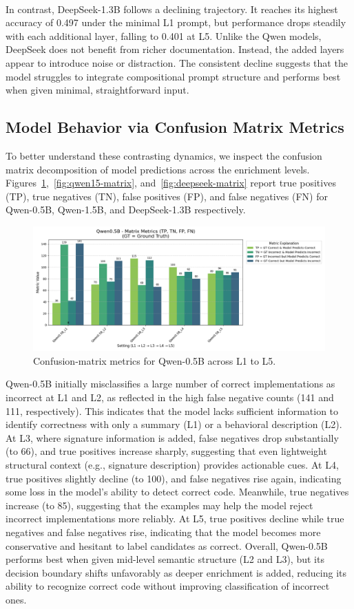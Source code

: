 \documentclass[a4paper]{usiinfbachelorproject}
\begin{document}
\\
In contrast, DeepSeek-1.3B follows a declining trajectory. It reaches its highest accuracy of 0.497 under the minimal L1 prompt, but performance drops steadily with each additional layer, falling to 0.401 at L5. Unlike the Qwen models, DeepSeek does not benefit from richer documentation. Instead, the added layers appear to introduce noise or distraction. The consistent decline suggests that the model struggles to integrate compositional prompt structure and performs best when given minimal, straightforward input.

\subsection{Model Behavior via Confusion Matrix Metrics}
To better understand these contrasting dynamics, we inspect the confusion matrix decomposition of model predictions across the enrichment levels. Figures~\ref{fig:qwen05-matrix},~\ref{fig:qwen15-matrix}, and~\ref{fig:deepseek-matrix} report true positives (TP), true negatives (TN), false positives (FP), and false negatives (FN) for Qwen-0.5B, Qwen-1.5B, and DeepSeek-1.3B respectively.
\begin{figure}[H]\centering
  \includegraphics[width=\linewidth]{figures/Qwen0.5B_matrix_metrics.png}
  \caption{Confusion-matrix metrics for Qwen-0.5B across L1 to L5.}
  \label{fig:qwen05-matrix}
\end{figure}
\noindent
Qwen-0.5B initially misclassifies a large number of correct implementations as incorrect at L1 and L2, as reflected in the high false negative counts (141 and 111, respectively). This indicates that the model lacks sufficient information to identify correctness with only a summary (L1) or a behavioral description (L2). At L3, where signature information is added, false negatives drop substantially (to 66), and true positives increase sharply, suggesting that even lightweight structural context (e.g., signature description) provides actionable cues. At L4, true positives slightly decline (to 100), and false negatives rise again, indicating some loss in the model's ability to detect correct code. Meanwhile, true negatives increase (to 85), suggesting that the examples may help the model reject incorrect implementations more reliably. At L5, true positives decline while true negatives and false negatives rise, indicating that the model becomes more conservative and hesitant to label candidates as correct. Overall, Qwen-0.5B performs best when given mid-level semantic structure (L2 and L3), but its decision boundary shifts unfavorably as deeper enrichment is added, reducing its ability to recognize correct code without improving classification of incorrect ones.
\end{document}
